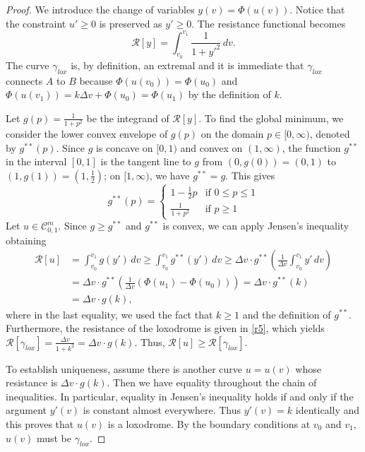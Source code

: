 \documentclass[10pt,a4paper]{amsart}
\def\R{\mathcal{ R}}
\begin{document}
\begin{proof}
We introduce the change of variables $y(v) = \Phi(u(v))$. Notice that the constraint $u' \ge 0$ is preserved as $y' \ge 0$. The resistance functional becomes 
\begin{equation}
\mathcal{R}[y] = \int_{v_0}^{v_1} \frac{1}{1 + y'^2}\, dv.
\end{equation}
The curve $\gamma_{lox}$ is, by definition, an extremal and it is immediate that $\gamma_{lox}$ connects $A$ to $B$ because $\Phi(u(v_0))=\Phi(u_0)$ and $\Phi(u(v_1))=k\Delta v+\Phi(u_0)=\Phi(u_1)$ by the definition of $k$. 

Let $g(p) = \frac{1}{1+p^2}$ be the integrand of $\mathcal{R}[y]$. To find the global minimum, we consider the lower convex envelope of $g(p)$ on the domain $p \in [0, \infty)$, denoted by $g^{**}(p)$. Since $g$ is concave on $[0,1)$ and convex on $(1,\infty)$, the function $g^{**}$ in the interval $[0,1]$ is the tangent line to $g$ from $(0, g(0)) = (0, 1)$ to $(1,g(1))=(1,\frac12)$; on $[1,\infty)$, we have $g^{**}=g$. This gives
\begin{equation}
g^{**}(p) = \begin{cases} 
1 - \frac{1}{2}p & \text{if } 0 \le p \le 1 \\
\frac{1}{1+p^2} & \text{if } p \geq 1 
\end{cases}
\end{equation}
Let $u\in \mathcal{C}_{0,1}^m$. Since $g\geq g^{**} $ and $g^{**}$ is convex, we can apply Jensen's inequality obtaining
\begin{equation}
 \begin{split}
\R[u]&= \int_{v_0}^{v_1} g(y')\, dv \ge \int_{v_0}^{v_1} g^{**}(y')\, dv \ge \Delta v\cdot g^{**} \left( \frac{1}{\Delta v} \int_{v_0}^{v_1} y'\, dv \right) \\
&= \Delta v\cdot g^{**} \left( \frac{1}{\Delta v} (\Phi(u_1)-\Phi(u_0)) \right)= \Delta v\cdot g^{**}(k)\\
&=\Delta v\cdot g(k),
\end{split}
\end{equation}
where in the last equality, we used the fact that $k\geq 1$ and the definition of $g^{**}$. Furthermore, the resistance of the loxodrome is given in \eqref{r5}, which yields $\R[\gamma_{lox}]=\frac{\Delta v}{1+k^2}=\Delta v\cdot g(k)$. Thus, $\R[u]\geq \R[\gamma_{lox}]$. 

To establish uniqueness, assume there is another curve $u=u(v)$ whose resistance is $\Delta v\cdot g(k)$. Then we have equality throughout the chain of inequalities. In particular, equality in Jensen's inequality holds if and only if the argument $y'(v)$ is constant almost everywhere. Thus $y'(v) = k$ identically and this proves that $u(v)$ is a loxodrome. By the boundary conditions at $v_0$ and $v_1$, $u(v)$ must be $\gamma_{lox}$. 
\end{proof}
\end{document}
